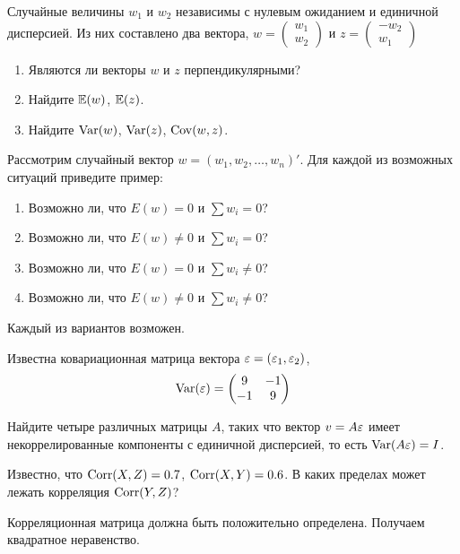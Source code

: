 \begin{problem}
Случайные величины $w_1$ и $w_2$ независимы с нулевым ожиданием и единичной дисперсией. Из них составлено два вектора,
$w=\left(
\begin{array}{c}
w_1 \\
w_2
\end{array}\right)$
и
$z=\left(
\begin{array}{c}
-w_2 \\
w_1
\end{array}\right)$
\begin{enumerate}
\item Являются ли векторы $w$ и $z$ перпендикулярными?
\item Найдите $\mathbb{E}(w)$, $\mathbb{E}(z)$.
\item Найдите $\operatorname{Var}(w)$, $\operatorname{Var}(z)$, $\operatorname{Cov}(w,z)$.
\end{enumerate}


\begin{sol}
\end{sol}
\end{problem}



\begin{problem}
Рассмотрим случайный вектор $w=(w_1, w_2, \ldots, w_n)'$. Для каждой из возможных ситуаций приведите пример:
\begin{enumerate}
\item Возможно ли, что $E(w)=0$ и $\sum w_i=0$?
\item Возможно ли, что $E(w)\neq 0$ и $\sum w_i=0$?
\item Возможно ли, что $E(w)=0$ и $\sum w_i \neq 0$?
\item Возможно ли, что $E(w)\neq 0$ и $\sum w_i \neq 0$?
\end{enumerate}


\begin{sol}
Каждый из вариантов возможен.
\end{sol}
\end{problem}



\begin{problem}
Известна ковариационная матрица вектора $\varepsilon=(\varepsilon_1,\varepsilon_2)$,
\[
\operatorname{Var}(\varepsilon)=\left(
\begin{matrix}
9 & -1 \\
-1 & 9
\end{matrix}
\right)
\]

Найдите четыре различных матрицы $A$, таких что вектор $v=A\varepsilon$ имеет некоррелированные компоненты с единичной дисперсией, то есть $\operatorname{Var}(A\varepsilon)=I$.


\begin{sol}
\end{sol}
\end{problem}


\begin{problem}
Известно, что $\operatorname{Corr}(X, Z) = 0.7$, $\operatorname{Corr}(X, Y)= 0.6$. В каких пределах может лежать корреляция $\operatorname{Corr}(Y, Z)$?

\begin{sol}
Корреляционная матрица должна быть положительно определена. Получаем квадратное неравенство.
\end{sol}
\end{problem}



